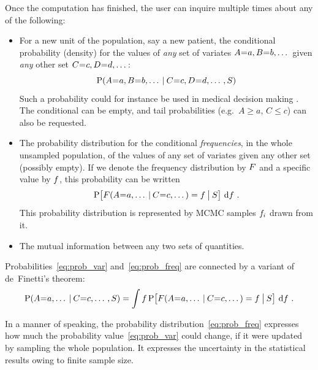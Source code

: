 Once the computation has finished, the user can inquire multiple times about any of the following:
\vspace{-\topsep}
\setlength{\leftmargini}{17.62pt}
\begin{itemize}
  \itemsep0.5ex
\item For a new unit of the population, say a new patient, the conditional probability (density) for the values of \emph{any} set of variates $A \mo a, B \mo b, \dotso$ given \emph{any} other set $C \mo c, D \mo d, \dotso$:
  \begin{equation}\label{eq:prob_var}
    \P(A \mo a, B \mo b, \dotso \|C \mo c, D \mo d, \dotso , S)
  \end{equation}
  Such a probability could for instance be used in medical decision making \citep{soxetal1988_r2024,huninketal2001_r2014}. The conditional can be empty, and tail probabilities (e.g.\ $A \ge a$, $C \le c$) can also be requested.

\item The probability distribution for the conditional \emph{frequencies}, in the whole unsampled population, of the values of any set of variates given any other set (possibly empty). If we denote the frequency distribution by $F$ and a specific value by $f$, this probability can be written
  \begin{equation}\label{eq:prob_freq}
    \P\bigl[ \yF(A \mo a, \dotso \|C \mo c, \dotso) = \yf \|[\big] S\bigr]
    \,\di\yf \ .
  \end{equation}
This probability distribution is represented by MCMC samples $f_{i}$ drawn from it.

\item The mutual information \citep[Ch.~8]{mackay1995_r2005} between any two sets of quantities.
\end{itemize}
\vspace{-\topsep}

Probabilities~\eqref{eq:prob_var} and~\eqref{eq:prob_freq} are connected by a variant of de~Finetti's theorem:
\begin{equation}
  \label{eq:definetti1}
  \P(A \mo a, \dotso \|C \mo c, \dotso , S)  =
  \int \yf \,
  \P\bigl[ \yF(A \mo a, \dotso \|C \mo c, \dotso) = \yf \|[\big] S\bigr]
  \,\di\yf \ .
\end{equation}

In a manner of speaking, the probability distribution~\eqref{eq:prob_freq} expresses how much the probability value~\eqref{eq:prob_var} could change, if it were updated by sampling the whole population. It expresses the uncertainty in the statistical results owing to finite sample size.

